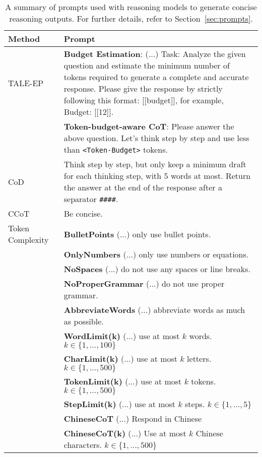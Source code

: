 \begin{table}[t]
\centering
\small
\setlength{\tabcolsep}{4pt}
\renewcommand{\arraystretch}{1.2}
\caption{A summary of prompts used with reasoning models to generate concise reasoning outputs. For further details, refer to Section~\ref{sec:prompts}.}
\begin{tabularx}{\textwidth}{lX}
\toprule
\textbf{Method} & \textbf{Prompt} \\
\midrule
TALE-EP \cite{han2024token} & \textbf{Budget Estimation}: (...) Task: Analyze the given question and estimate the minimum number of tokens required to generate a complete and accurate response. Please give the response by strictly following this format: [[budget]], for example, Budget: [[12]].\\
& \textbf{Token-budget-aware CoT}: Please answer the above question. Let's think step by step and use less than \texttt{<Token-Budget>} tokens. \\
\midrule
CoD \cite{xu2025chain} & Think step by step, but only keep a minimum draft for each thinking step, with 5 words at most. Return the answer at the end of the response after a separator \texttt{\#\#\#\#}. \\
\midrule
CCoT \cite{renze2024benefits} & Be concise. \\
\midrule
Token Complexity~\cite{lee2025well} & \textbf{BulletPoints} (...) only use bullet points.\\
& \textbf{OnlyNumbers} (...) only use numbers or equations.\\
& \textbf{NoSpaces} (...) do not use any spaces or line breaks.\\
& \textbf{NoProperGrammar} (...) do not use proper grammar.\\
& \textbf{AbbreviateWords} (...) abbreviate words as much as possible.\\
& \textbf{WordLimit(k)} (...) use at most $k$ words. $k \in \{1, \dots, 100\}$\\
& \textbf{CharLimit(k)} (...) use at most $k$ letters. $k \in \{1, \dots, 500\}$\\
& \textbf{TokenLimit(k)} (...) use at most $k$ tokens. $k \in \{1, \dots, 500\}$\\
& \textbf{StepLimit(k)} (...) use at most $k$ steps. $k \in \{1, \dots, 5\}$\\
& \textbf{ChineseCoT} (...) Respond in Chinese\\
& \textbf{ChineseCoT(k)} (...) Use at most $k$ Chinese characters. $k \in \{1, \dots, 500\}$\\
\bottomrule
\end{tabularx}
\label{tab:prompts}
\end{table}

